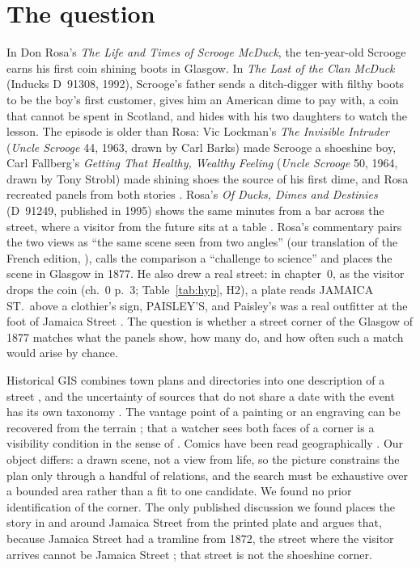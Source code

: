 \documentclass[10pt,a4paper]{article}
\begin{document}
\section{The question}\label{sec:question}
In Don Rosa's \emph{The Life and Times of Scrooge McDuck}, the ten-year-old Scrooge earns his first coin shining boots in Glasgow. In \emph{The Last of the Clan McDuck} (Inducks D~91308, 1992), Scrooge's father sends a ditch-digger with filthy boots to be the boy's first customer, gives him an American dime to pay with, a coin that cannot be spent in Scotland, and hides with his two daughters to watch the lesson. The episode is older than Rosa: Vic Lockman's \emph{The Invisible Intruder} (\emph{Uncle Scrooge} 44, 1963, drawn by Carl Barks) made Scrooge a shoeshine boy, Carl Fallberg's \emph{Getting That Healthy, Wealthy Feeling} (\emph{Uncle Scrooge} 50, 1964, drawn by Tony Strobl) made shining shoes the source of his first dime, and Rosa recreated panels from both stories \citep{ottens2020clan}. Rosa's \emph{Of Ducks, Dimes and Destinies} (D~91249, published in 1995) shows the same minutes from a bar across the street, where a visitor from the future sits at a table \citep{rosa2015library4,inducks}. Rosa's commentary pairs the two views as ``the same scene seen from two angles'' (our translation of the French edition, \citealp[p.~25]{rosa2012glenat2}), calls the comparison a ``challenge to science'' and places the scene in Glasgow in 1877. He also drew a real street: in chapter~0, as the visitor drops the coin (ch.~0 p.~3; Table~\ref{tab:hyp}, H2), a plate reads JAMAICA ST.\ above a clothier's sign, PAISLEY'S, and Paisley's was a real outfitter at the foot of Jamaica Street \citep{canmorePaisley,gracesPaisley,ottens2020neverwas}. The question is whether a street corner of the Glasgow of 1877 matches what the panels show, how many do, and how often such a match would arise by chance.

Historical GIS combines town plans and directories into one description of a street \citep{gregory2007hgis,shaw1984directories,cura2018geocoding}, and the uncertainty of sources that do not share a date with the event has its own taxonomy \citep{plewe2002uncertainty}. The vantage point of a painting or an engraving can be recovered from the terrain \citep{frajer2019canvas,zohar2021engravings,aubry2014painting,olson2014sleuth}; that a watcher sees both faces of a corner is a visibility condition in the sense of \citet{benedikt1979isovist}. Comics have been read geographically \citep{dittmer2010visualities}. Our object differs: a drawn scene, not a view from life, so the picture constrains the plan only through a handful of relations, and the search must be exhaustive over a bounded area rather than a fit to one candidate. We found no prior identification of the corner. The only published discussion we found places the story in and around Jamaica Street from the printed plate and argues that, because Jamaica Street had a tramline from 1872, the street where the visitor arrives cannot be Jamaica Street \citep{ottens2020neverwas}; that street is not the shoeshine corner.
\end{document}

